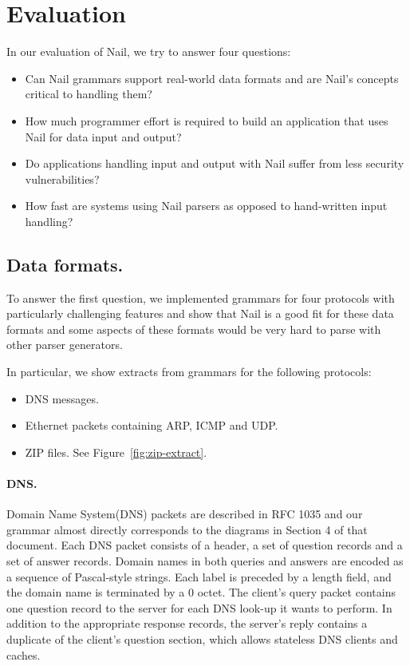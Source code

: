 \section{Evaluation}
\label{s:eval}



In our evaluation of Nail, we try to answer four questions:

\begin{itemize}
\item Can Nail grammars support real-world data formats and are Nail's concepts critical to handling
  them?
\item How much programmer effort is required to build an
      application that uses Nail for data input and output?
\item Do applications handling input and output with Nail suffer from less security vulnerabilities?
\item How fast are systems using Nail parsers as opposed to hand-written input handling? 
\end{itemize}

\subsection{Data formats.}
\label{s:eval-formats}
To answer the first question, we implemented grammars for four protocols with particularly
challenging features and show that Nail is a good fit for these data formats and some aspects of
these formats would be very hard to parse with other parser generators.



In particular, we show extracts from grammars for the following protocols: 
\begin{itemize}
\item DNS messages.
\item Ethernet packets containing ARP, ICMP and UDP.
\item ZIP files.
  See Figure~\ref{fig:zip-extract}.
\end{itemize}

\paragraph{DNS.}
Domain Name System(DNS) packets are described in RFC 1035 and our grammar almost directly
corresponds to the diagrams in Section 4 of that document. Each DNS packet consists of a header, a
set of question records and a set of answer records. Domain names in both queries and answers are
encoded as a sequence of Pascal-style strings. Each label is preceded by a length field, and the
domain name is terminated by a $0$ octet. The client's query packet contains one question
record to the server for each DNS look-up it wants to perform. In addition to the appropriate
response records, the server's reply contains a duplicate of the client's question section, which
allows stateless DNS clients and caches.

